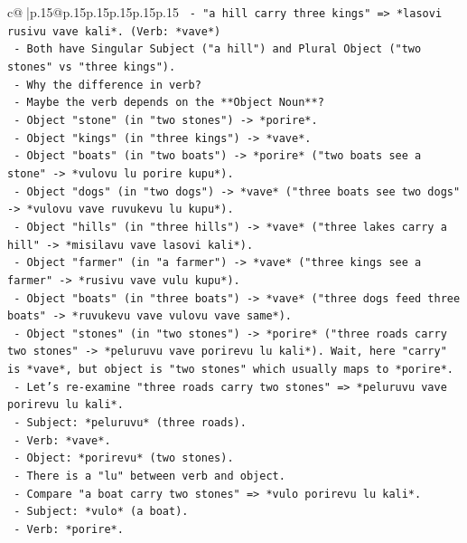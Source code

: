 \documentclass{article}
\begin{document}
{\begin{supertabular}{c@{$\;$}|p{.15\linewidth}@{}p{.15\linewidth}p{.15\linewidth}p{.15\linewidth}p{.15\linewidth}p{.15\linewidth}}
{{{\texttt{     {-} "a hill carry three kings" => *lasovi rusivu vave kali*. (Verb: *vave*)} \\
\texttt{     {-} Both have Singular Subject ("a hill") and Plural Object ("two stones" vs "three kings").} \\
\texttt{     {-} Why the difference in verb?} \\
\texttt{     {-} Maybe the verb depends on the **Object Noun**?} \\
\texttt{       {-} Object "stone" (in "two stones") {-}> *porire*.} \\
\texttt{       {-} Object "kings" (in "three kings") {-}> *vave*.} \\
\texttt{       {-} Object "boats" (in "two boats") {-}> *porire* ("two boats see a stone" {-}> *vulovu lu porire kupu*).} \\
\texttt{       {-} Object "dogs" (in "two dogs") {-}> *vave* ("three boats see two dogs" {-}> *vulovu vave ruvukevu lu kupu*).} \\
\texttt{       {-} Object "hills" (in "three hills") {-}> *vave* ("three lakes carry a hill" {-}> *misilavu vave lasovi kali*).} \\
\texttt{       {-} Object "farmer" (in "a farmer") {-}> *vave* ("three kings see a farmer" {-}> *rusivu vave vulu kupu*).} \\
\texttt{       {-} Object "boats" (in "three boats") {-}> *vave* ("three dogs feed three boats" {-}> *ruvukevu vave vulovu vave same*).} \\
\texttt{       {-} Object "stones" (in "two stones") {-}> *porire* ("three roads carry two stones" {-}> *peluruvu vave porirevu lu kali*). Wait, here "carry" is *vave*, but object is "two stones" which usually maps to *porire*.} \\
\texttt{       {-} Let's re{-}examine "three roads carry two stones" => *peluruvu vave porirevu lu kali*.} \\
\texttt{         {-} Subject: *peluruvu* (three roads).} \\
\texttt{         {-} Verb: *vave*.} \\
\texttt{         {-} Object: *porirevu* (two stones).} \\
\texttt{         {-} There is a "lu" between verb and object.} \\
\texttt{       {-} Compare "a boat carry two stones" => *vulo porirevu lu kali*.} \\
\texttt{         {-} Subject: *vulo* (a boat).} \\
\texttt{         {-} Verb: *porire*.} \\
}}}
\end{supertabular}}
\end{document}
